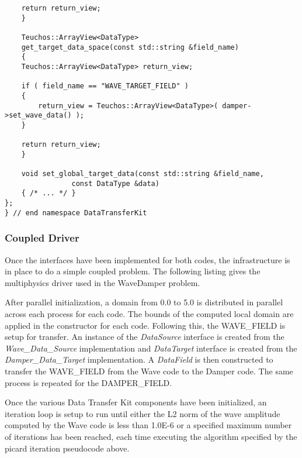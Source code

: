 \documentclass[letterpaper]{article}
\begin{document}
\begin{lstlisting}
	return return_view;
    }

    Teuchos::ArrayView<DataType> 
    get_target_data_space(const std::string &field_name)
    {
	Teuchos::ArrayView<DataType> return_view;

	if ( field_name == "WAVE_TARGET_FIELD" )
	{
	    return_view = Teuchos::ArrayView<DataType>( damper->set_wave_data() );
	}

	return return_view;
    }

    void set_global_target_data(const std::string &field_name,
				const DataType &data)
    { /* ... */ }
};
} // end namespace DataTransferKit
\end{lstlisting}

\subsubsection{Coupled Driver}
Once the interfaces have been implemented for both codes, the
infrastructure is in place to do a simple coupled problem. The
following listing gives the multiphysics driver used in the WaveDamper
problem.

After parallel initialization, a domain from 0.0 to 5.0 is distributed
in parallel across each process for each code. The bounds of the
computed local domain are applied in the constructor for each
code. Following this, the WAVE\_FIELD is setup for transfer. An
instance of the {\sl DataSource} interface is created from the {\sl
  Wave\_Data\_Source} implementation and {\sl DataTarget} interface
is created from the {\sl Damper\_Data\_Target} implementation. A {\sl
  DataField} is then constructed to transfer the WAVE\_FIELD from
the Wave code to the Damper code. The same process is repeated for the
DAMPER\_FIELD. 

Once the various Data Transfer Kit components have been initialized, an
iteration loop is setup to run until either the L2 norm of the wave
amplitude computed by the Wave code is less than 1.0E-6 or a specified
maximum number of iterations has been reached, each time executing the
algorithm specified by the picard iteration pseudocode above.
\end{document}
